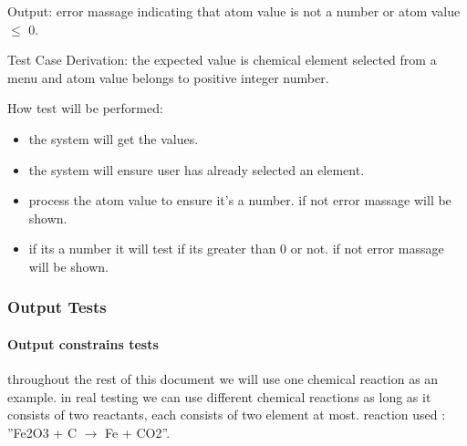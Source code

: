 \documentclass[12pt, titlepage]{article}
\begin{document}
\begin{enumerate}
Output: error massage indicating that atom value is not a number or atom value $\leq$ 0. 

Test Case Derivation: the expected value is chemical element selected from a menu and atom value belongs to positive integer number. 

How test will be performed: 
\begin{itemize}
\item the system will get the values. 
\item the system will ensure user has already selected an element. 
\item process the atom value to ensure it's a number. if not error massage will be shown.
\item if its a number it will test if its greater than 0 or not.  if not error massage will be shown.
\end{itemize}


\end{enumerate}					

\subsubsection{Output Tests}

\paragraph{Output constrains tests}
throughout the rest of this document we will use one chemical reaction as an example. in real testing we can use different chemical reactions as long as it consists of two reactants, each consists of two element at most.
reaction used : ”Fe2O3 + C $\rightarrow$ Fe + CO2”. 
\end{document}
